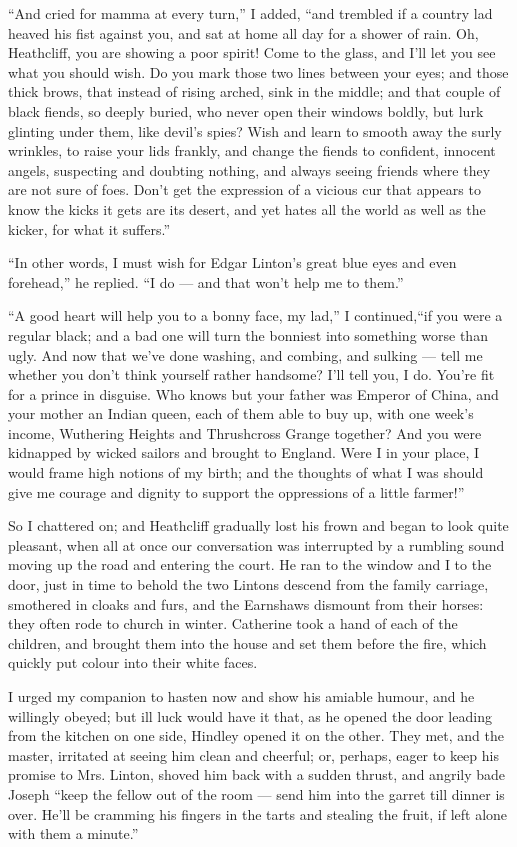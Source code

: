 \par “And cried for mamma at every turn,” I added, “and trembled if a country lad heaved his fist against you, and sat at home all day for a shower of rain. Oh, Heathcliff, you are showing a poor spirit! Come to the glass, and I'll let you see what you should wish. Do you mark those two lines between your eyes; and those thick brows, that instead of rising arched, sink in the middle; and that couple of black fiends, so deeply buried, who never open their windows boldly, but lurk glinting under them, like devil's spies? Wish and learn to smooth away the surly wrinkles, to raise your lids frankly, and change the fiends to confident, innocent angels, suspecting and doubting nothing, and always seeing friends where they are not sure of foes. Don't get the expression of a vicious cur that appears to know the kicks it gets are its desert, and yet hates all the world as well as the kicker, for what it suffers.”
\par “In other words, I must wish for Edgar Linton's great blue eyes and even forehead,” he replied. “I do — and that won't help me to them.”
\par “A good heart will help you to a bonny face, my lad,” I continued,“if you were a regular black; and a bad one will turn the bonniest into something worse than ugly. And now that we've done washing, and combing, and sulking — tell me whether you don't think yourself rather handsome? I'll tell you, I do. You're fit for a prince in disguise. Who knows but your father was Emperor of China, and your mother an Indian queen, each of them able to buy up, with one week's income, Wuthering Heights and Thrushcross Grange together? And you were kidnapped by wicked sailors and brought to England. Were I in your place, I would frame high notions of my birth; and the thoughts of what I was should give me courage and dignity to support the oppressions of a little farmer!”
\par So I chattered on; and Heathcliff gradually lost his frown and began to look quite pleasant, when all at once our conversation was interrupted by a rumbling sound moving up the road and entering the court. He ran to the window and I to the door, just in time to behold the two Lintons descend from the family carriage, smothered in cloaks and furs, and the Earnshaws dismount from their horses: they often rode to church in winter. Catherine took a hand of each of the children, and brought them into the house and set them before the fire, which quickly put colour into their white faces.
\par I urged my companion to hasten now and show his amiable humour, and he willingly obeyed; but ill luck would have it that, as he opened the door leading from the kitchen on one side, Hindley opened it on the other. They met, and the master, irritated at seeing him clean and cheerful; or, perhaps, eager to keep his promise to Mrs. Linton, shoved him back with a sudden thrust, and angrily bade Joseph “keep the fellow out of the room — send him into the garret till dinner is over. He'll be cramming his fingers in the tarts and stealing the fruit, if left alone with them a minute.”
